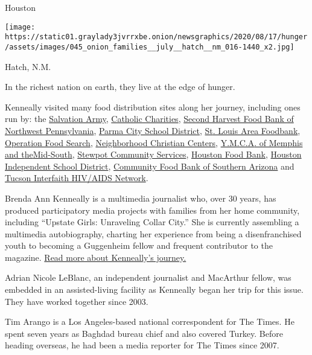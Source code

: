 Houston

\texttt{[image: https://static01.graylady3jvrrxbe.onion/newsgraphics/2020/08/17/hunger/assets/images/045\_onion\_families\_\_july\_\_hatch\_\_nm\_016-1440\_x2.jpg]}

Hatch, N.M.

In the richest nation on earth, they live at the edge of hunger.

Kenneally visited many food distribution sites along her journey,
including ones run by: the
\href{https://www.salvationarmyusa.org/usn/ways-to-give/}{Salvation
Army}, \href{https://catholiccharitiesny.org/}{Catholic Charities},
\href{https://nwpafoodbank.org/}{Second Harvest Food Bank of Northwest
Pennsylvania}, \href{https://www.parmacityschools.org/}{Parma City
School District},
\href{https://stlfoodbank.org/}{St}\href{https://stlfoodbank.org/}{.
Louis Area Foodbank},
\href{https://www.operationfoodsearch.org/}{Operation Food Search},
\href{https://www.ncclife.org/}{Neighborhood Christian Centers},
\href{https://www.ymcamemphis.org/}{Y.M.C.A}\href{https://www.ymcamemphis.org/}{.
of Memphis and
t}\href{https://www.ymcamemphis.org/}{he}\href{https://www.ymcamemphis.org/}{}\href{https://www.ymcamemphis.org/}{Mid-South},
\href{https://stewpot.org/}{Stewpot Community Services},
\href{https://www.houstonfoodbank.org/}{Houston Food Bank},
\href{https://www.houstonisd.org/Page/126421}{Houston Independent School
District}, \href{https://www.communityfoodbank.org/}{Community Food Bank
of Southern Arizona} and \href{https://tihan.org/donate/}{Tucson
Interfaith HIV/AIDS Network}.

Brenda Ann Kenneally is a multimedia journalist who, over 30 years, has
produced participatory media projects with families from her home
community, including ``Upstate Girls: Unraveling Collar City.'' She is
currently assembling a multimedia autobiography, charting her experience
from being a disenfranchised youth to becoming a Guggenheim fellow and
frequent contributor to the magazine.
\href{https://www.nytimes3xbfgragh.onion/2020/09/02/insider/food-insecurity-families.html}{Read
more about Kenneally's journey.}

Adrian Nicole LeBlanc, an independent journalist and MacArthur fellow,
was embedded in an assisted-living facility as Kenneally began her trip
for this issue. They have worked together since 2003.

Tim Arango is a Los Angeles-based national correspondent for The Times.
He spent seven years as Baghdad bureau chief and also covered Turkey.
Before heading overseas, he had been a media reporter for The Times
since 2007.

